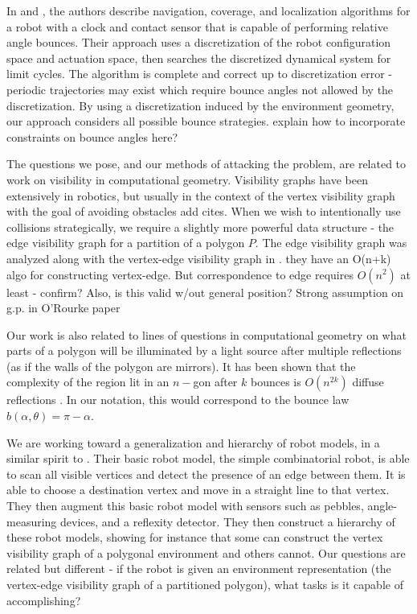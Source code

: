 \documentclass[]{styles/svproc}  %
\begin{document}
In \cite{alam2017minimalist} and \cite{alam2018space}, the authors describe
navigation, coverage, and localization algorithms for a robot with a clock and
contact sensor that is capable of performing relative angle bounces. Their
approach uses a discretization of the robot configuration space and actuation
space, then searches the discretized dynamical system for limit cycles. The
algorithm is complete and correct up to discretization error - periodic
trajectories may exist which require bounce angles not allowed by the
discretization. By using a discretization induced by the environment geometry, our 
approach considers all possible bounce strategies. {\color{red} explain how to
incorporate constraints on bounce angles here?}

The questions we pose, and our methods of attacking the problem, are related to
work on visibility in computational geometry. Visibility graphs have been
extensively in robotics, but usually in the context of the vertex visibility
graph with the goal of avoiding obstacles {\color{red} add cites}. When we wish
to intentionally use collisions strategically, we require a slightly more
powerful data structure - the edge
visibility graph for a partition of a polygon $P$. The edge visibility graph 
was analyzed along with the vertex-edge visibility graph in \cite{rourke_viz}. {\color{red} they have an
O(n+k) algo for constructing vertex-edge. But correspondence to edge
requires $O(n^2)$ at least - confirm? Also, is this valid w/out general
position? Strong assumption on g.p. in O'Rourke paper}

Our work is also related to lines of questions in computational geometry on what
parts of a polygon will be illuminated by a light source after multiple
reflections (as if the walls of the polygon are mirrors). It has been shown that
the complexity of the region lit in an $n-$gon after $k$ bounces is $O(n^{2k})$
{\color{red} diffuse reflections} \cite{Aronov1996,prasad1998visibility}. In our
notation, this would correspond to the bounce law
$b(\alpha, \theta) = \pi - \alpha$.

We are working toward a generalization and hierarchy of robot models, in a
similar spirit to \cite{brunner2008simple}. Their basic robot model, the simple
combinatorial robot, is able to scan all visible vertices and detect the
presence of an edge between them. It is able to choose a destination vertex and
move in a straight line to that vertex. They then augment this basic robot model
with sensors such as pebbles, angle-measuring devices, and a reflexity detector.
They then construct a hierarchy of these robot models, showing for instance that
some can construct the vertex visibility graph of a polygonal environment
and others cannot. Our questions are related but different - if the robot is
given an environment representation (the vertex-edge visibility graph of a
partitioned polygon), what tasks is it capable of accomplishing?
\end{document}
